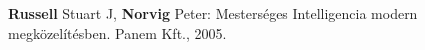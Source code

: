 \begin{thebibliography}{9}
\textbf{Russell} Stuart J, \textbf{Norvig} Peter:
Mesterséges Intelligencia modern megközelítésben.
Panem Kft., 2005.
\end{thebibliography}
